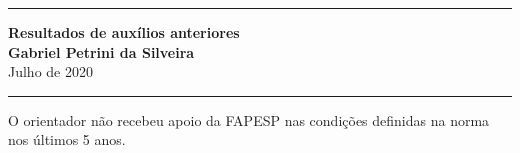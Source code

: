 \documentclass[11pt,a4paper]{article}
\date{Julho de 2020}
\begin{document}
\begin{center}
	\rule{\textwidth}{1.2pt}
	\textbf{Resultados de auxílios anteriores}\\
	\Large\textbf{Gabriel Petrini da Silveira}\\
	Julho de 2020
	\rule{\textwidth}{1.2pt}
\end{center}

\noindent O orientador não recebeu apoio da FAPESP nas condições definidas na norma nos últimos 5 anos.
\end{document}

